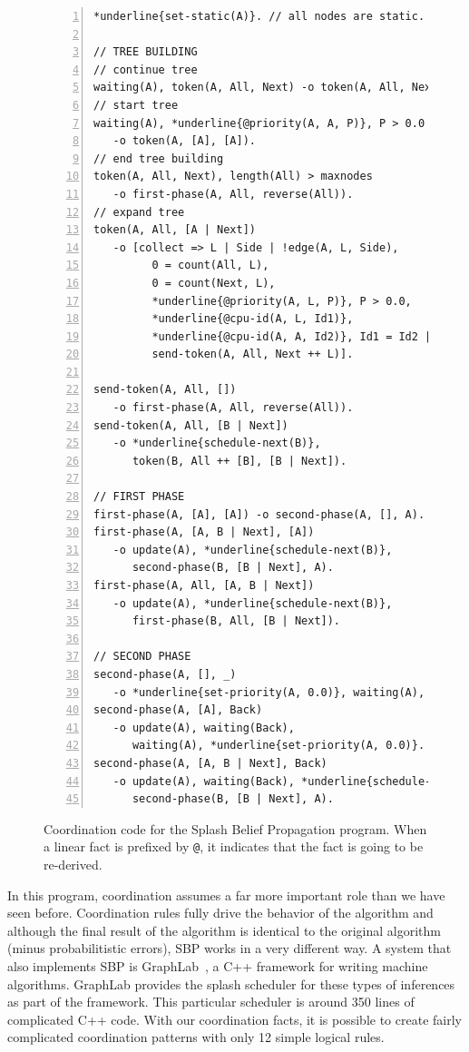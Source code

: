 \begin{figure}[h!]
\scriptsize\begin{Verbatim}[numbers=left,commandchars=*\{\}]
*underline{set-static(A)}. // all nodes are static.

// TREE BUILDING
// continue tree
waiting(A), token(A, All, Next) -o token(A, All, Next).
// start tree
waiting(A), *underline{@priority(A, A, P)}, P > 0.0
   -o token(A, [A], [A]).
// end tree building
token(A, All, Next), length(All) > maxnodes
   -o first-phase(A, All, reverse(All)).
// expand tree
token(A, All, [A | Next])
   -o [collect => L | Side | !edge(A, L, Side),
         0 = count(All, L),
         0 = count(Next, L),
         *underline{@priority(A, L, P)}, P > 0.0,
         *underline{@cpu-id(A, L, Id1)},
         *underline{@cpu-id(A, A, Id2)}, Id1 = Id2 |
         send-token(A, All, Next ++ L)].

send-token(A, All, [])
   -o first-phase(A, All, reverse(All)).
send-token(A, All, [B | Next])
   -o *underline{schedule-next(B)},
      token(B, All ++ [B], [B | Next]).

// FIRST PHASE
first-phase(A, [A], [A]) -o second-phase(A, [], A).
first-phase(A, [A, B | Next], [A])
   -o update(A), *underline{schedule-next(B)},
      second-phase(B, [B | Next], A).
first-phase(A, All, [A, B | Next])
   -o update(A), *underline{schedule-next(B)},
      first-phase(B, All, [B | Next]).

// SECOND PHASE
second-phase(A, [], _)
   -o *underline{set-priority(A, 0.0)}, waiting(A), update(A).
second-phase(A, [A], Back)
   -o update(A), waiting(Back),
      waiting(A), *underline{set-priority(A, 0.0)}.
second-phase(A, [A, B | Next], Back)
   -o update(A), waiting(Back), *underline{schedule-next(B)},
      second-phase(B, [B | Next], A).
\end{Verbatim}
  \caption{Coordination code for the Splash Belief Propagation program. When a
     linear fact is prefixed by \texttt{@}, it indicates that the fact is going
  to be re-derived.}
  \label{code:sbp}
\end{figure}
\normalsize

In this program, coordination assumes a far more important role than we have
seen before. Coordination rules fully drive the behavior of the algorithm and
although the final result of the algorithm is identical to the original
algorithm (minus probabilitistic errors), SBP works in a very different way.
A system that also implements SBP is
GraphLab~\cite{GraphLab2010}, a C++ framework for writing machine algorithms.
GraphLab provides the splash scheduler for these types of inferences as part of
the framework. This particular scheduler is around 350 lines of complicated C++ code.
With our coordination facts, it is possible to create fairly complicated coordination
patterns with only 12 simple logical rules.

